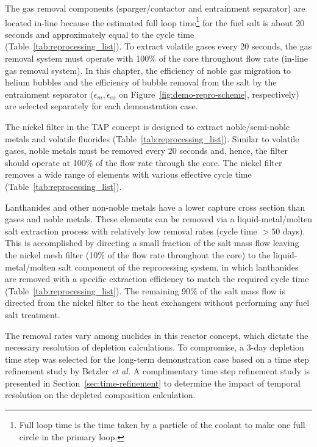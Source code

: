 The gas removal components (sparger/contactor and entrainment separator) are 
located in-line because the estimated full loop time\footnote{Full loop time 
is the time taken by a particle of the coolant to make one full circle in the 
primary loop.} for the fuel salt is about 20 seconds and approximately equal 
to the cycle time (Table~\ref{tab:reprocessing_list}). To extract volatile 
gases every 20 seconds, the gas removal system must operate with 100\% of the 
core throughout flow rate (in-line gas removal system). In this chapter, the 
efficiency of noble gas migration to helium bubbles and the efficiency of 
bubble removal from the salt by the entrainment separator  
($\epsilon_m,\epsilon_{es}$ on Figure~\ref{fig:demo-repro-scheme},  
respectively) are selected separately for each demonstration case.

The nickel filter in the \gls{TAP} concept is designed to extract 
noble/semi-noble metals and volatile fluorides 
(Table~\ref{tab:reprocessing_list}). Similar to volatile gases, 
noble metals must be removed every 20 seconds and, hence, the filter should 
operate at 100\% of the flow rate through the core. The nickel filter removes 
a wide range of elements with various effective cycle time 
(Table~\ref{tab:reprocessing_list}).

Lanthanides and other non-noble metals have a lower capture cross section than 
gases and noble metals. These elements can be removed via a 
liquid-metal/molten salt extraction process with relatively low removal rates 
(cycle time $>50$ days). This is accomplished by directing a small fraction of 
the salt mass flow leaving the nickel mesh filter (10\% of the flow rate 
throughout the core) to the liquid-metal/molten salt component of the 
reprocessing system, in which lanthanides are removed with a specific 
extraction efficiency to match the  required cycle time  
(Table~\ref{tab:reprocessing_list}). The remaining 90\% of the salt mass flow 
is directed from the nickel filter to the heat exchangers without performing 
any fuel salt treatment.

The removal rates vary among nuclides in this reactor concept, which dictate 
the necessary resolution of depletion calculations. To compromise, a 3-day 
depletion time step was selected for the long-term demonstration case based on 
a time step refinement study by Betzler \emph{et al.} 
\cite{betzler_assessment_2017-1} A complimentary time step refinement study is
presented in Section~\ref{sec:time-refinement} to determine the impact of 
temporal resolution on the depleted composition calculation.

